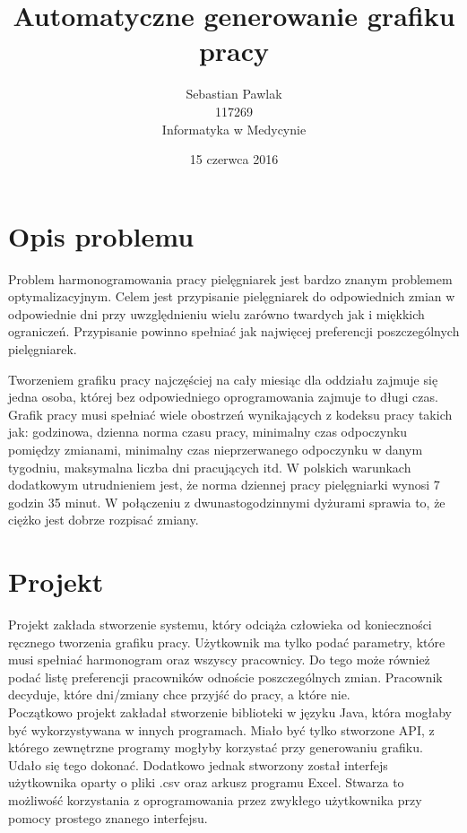 \documentclass{article}
\title{Automatyczne generowanie grafiku pracy}
\author{Sebastian Pawlak \\ 117269 \\ Informatyka w Medycynie}
\date{15 czerwca 2016}
\begin{document}
\maketitle
\newpage
\section{Opis problemu}

    Problem harmonogramowania pracy pielęgniarek jest bardzo znanym problemem optymalizacyjnym. Celem jest przypisanie pielęgniarek do odpowiednich zmian w odpowiednie dni przy uwzględnieniu wielu zarówno twardych jak i miękkich ograniczeń. Przypisanie powinno spełniać jak najwięcej preferencji poszczególnych pielęgniarek. \par
    Tworzeniem grafiku pracy najczęściej na cały miesiąc dla oddziału zajmuje się jedna osoba, której bez odpowiedniego oprogramowania zajmuje to długi czas. Grafik pracy musi spełniać wiele obostrzeń wynikających z kodeksu pracy takich jak: godzinowa, dzienna norma czasu pracy, minimalny czas odpoczynku pomiędzy zmianami, minimalny czas nieprzerwanego odpoczynku w danym tygodniu, maksymalna liczba dni pracujących itd. W polskich warunkach dodatkowym utrudnieniem jest, że norma dziennej pracy pielęgniarki wynosi 7 godzin 35 minut. W połączeniu z dwunastogodzinnymi dyżurami sprawia to, że ciężko jest dobrze rozpisać zmiany. 

\section{Projekt}
    Projekt zakłada stworzenie systemu, który odciąża człowieka od konieczności ręcznego tworzenia grafiku pracy. Użytkownik ma tylko podać parametry, które musi spełniać harmonogram oraz wszyscy pracownicy. Do tego może również podać listę preferencji pracowników odnoście poszczególnych zmian. Pracownik decyduje, które dni/zmiany chce przyjść do pracy, a które nie. \\
    Początkowo projekt zakładał stworzenie biblioteki w języku Java, która mogłaby być wykorzystywana w innych programach. Miało być tylko stworzone API, z którego zewnętrzne programy mogłyby korzystać przy generowaniu grafiku. Udało się tego dokonać. Dodatkowo jednak stworzony został interfejs użytkownika oparty o pliki .csv oraz arkusz programu Excel. Stwarza to możliwość korzystania z oprogramowania przez zwykłego użytkownika przy pomocy prostego znanego interfejsu.
\newpage
\end{document}
